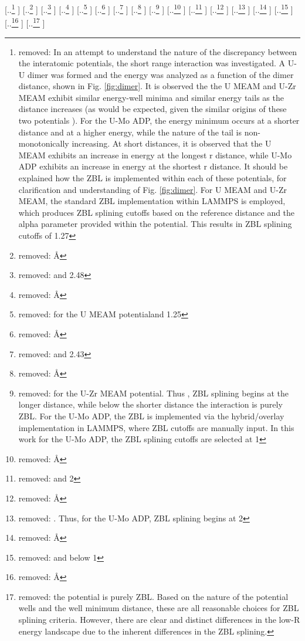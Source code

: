 \documentclass[review]{elsarticle}
\providecommand{\DIFdeltex}[1]{{\protect\color{red} [..\footnote{removed: #1} ]}} %
\providecommand{\DIFaddbegin}{} %
\providecommand{\DIFdelend}{} %
\providecommand{\DIFdel}[1]{\texorpdfstring{\DIFdeltex{#1}}{}} %
\newcommand{\DIFaddincludegraphics}[2][]{{\color{blue}\fbox{\DIFOincludegraphics[#1]{#2}}}} %
\DeclareRobustCommand{\DIFaddbegin}{\DIFOaddbegin \let\includegraphics\DIFaddincludegraphics} %
\DeclareRobustCommand{\DIFdelend}{\DIFOaddend \let\includegraphics\DIFOincludegraphics} %
\begin{document}
\DIFdel{In an attempt to understand the nature of the discrepancy between the interatomic potentials, the short range interaction was investigated. A U-U dimer was formed and the energy was analyzed as a function of the dimer distance, shown in Fig. \ref{fig:dimer}. It is observed the the U MEAM and U-Zr MEAM exhibit similar energy-well minima and similar energy tails as the distance increases (as would be expected, given the similar origins of these two potentials ). For the U-Mo ADP, the energy minimum occurs at a shorter distance and at a higher energy, while the nature of the tail is non-monotonically increasing. At short distances, it is observed that the U MEAM exhibits an increase in energy at the longest r distance, while U-Mo ADP exhibits an increase in energy at the shortest r distance. It should be explained how the ZBL is implemented within each of these potentials, for clarification and understanding of Fig. \ref{fig:dimer}. For U MEAM and U-Zr MEAM, the standard ZBL implementation within LAMMPS is employed, which produces ZBL splining cutoffs based on the reference distance and the alpha parameter provided within the potential. This results in ZBL splining cutoffs of 1.27 }%
\DIFdel{\AA}%
\DIFdel{and 2.48 }%
\DIFdel{\AA}%
\DIFdel{for the U MEAM potentialand 1.25 }%
\DIFdel{\AA}%
\DIFdel{and 2.43 }%
\DIFdel{\AA}%
\DIFdel{for the U-Zr MEAM potential. Thus , ZBL splining begins at the longer distance, while below the shorter distance the interaction is purely ZBL. For the U-Mo ADP, the ZBL is implemented via the hybrid/overlay implementation in LAMMPS, where ZBL cutoffs are manually input.
In this work for the U-Mo ADP, the ZBL splining cutoffs are selected at 1 }%
\DIFdel{\AA}%
\DIFdel{and 2 }%
\DIFdel{\AA}%
\DIFdel{. Thus, for the U-Mo ADP, ZBL splining begins at 2 }%
\DIFdel{\AA}%
\DIFdel{and below 1 }%
\DIFdel{\AA}%
\DIFdel{the potential is purely ZBL. Based on the nature of the potential wells and the well minimum distance, these are all reasonable choices for ZBL splining criteria. However, there are clear and distinct differences in the low-R energy landscape due to the inherent differences in the ZBL splining. }\DIFdelend \DIFaddbegin 
\end{document}
